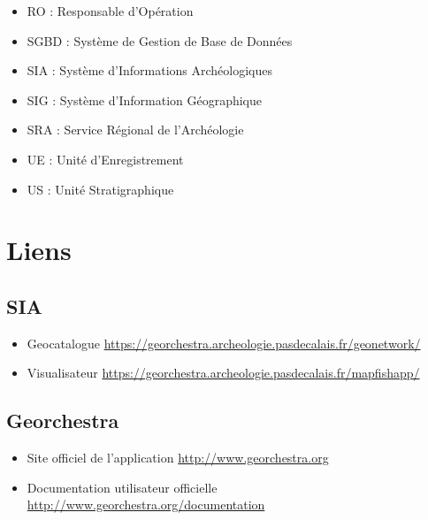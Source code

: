 \documentclass[letterpaper,10pt,french]{sphinxmanual}
\begin{document}
\begin{itemize}
\item {} 
RO : Responsable d’Opération

\item {} 
SGBD : Système de Gestion de Base de Données

\item {} 
SIA : Système d'Informations Archéologiques

\item {} 
SIG : Système d’Information Géographique

\item {} 
SRA : Service Régional de l’Archéologie

\item {} 
UE : Unité d’Enregistrement

\item {} 
US : Unité Stratigraphique

\end{itemize}


\chapter{Liens}
\label{manuel/liens::doc}\label{manuel/liens:liens}

\section{SIA}
\label{manuel/liens:sia}\begin{itemize}
\item {} 
Geocatalogue \href{https://georchestra.archeologie.pasdecalais.fr/geonetwork/srv/fr/main.home}{https://georchestra.archeologie.pasdecalais.fr/geonetwork/}

\item {} 
Visualisateur \href{https://georchestra.archeologie.pasdecalais.fr/mapfishapp/}{https://georchestra.archeologie.pasdecalais.fr/mapfishapp/}

\end{itemize}


\section{Georchestra}
\label{manuel/liens:georchestra}\begin{itemize}
\item {} 
Site officiel de l'application \href{http://www.georchestra.org/}{http://www.georchestra.org}

\item {} 
Documentation utilisateur officielle \href{http://www.georchestra.org/documentation/index.html}{http://www.georchestra.org/documentation}

\end{itemize}
\end{document}
